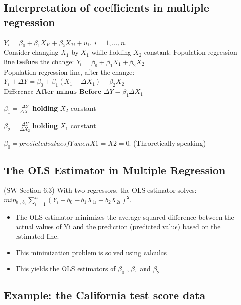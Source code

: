 \documentclass[
  letterpaper,
  DIV=11,
  numbers=noendperiod]{scrartcl}
\begin{document}
\hypertarget{interpretation-of-coefficients-in-multiple-regression}{%
\subsection{Interpretation of coefficients in multiple
regression}\label{interpretation-of-coefficients-in-multiple-regression}}

\(Y_i = \beta_0 + \beta_1 X_{1i} + \beta_2 X_{2i} + u_i, \ i=1,\dots,n.\)\\
Consider changing \(X_1\) by \(X_1\) while holding \(X_2\) constant:
Population regression line \textbf{before} the change:
\(Y_i = \beta_0 + \beta_1 X_1 + \beta_2 X_2\)\\
Population regression line, after the change:
\(Y_i+{\Delta Y} = \beta_0 + \beta_1 (X_1+{\Delta X_1}) + \beta_2 X_2\)\\
Difference \textbf{After minus Before}
\({\Delta Y} = \beta_1 {\Delta X_1}\)

\(\beta_1=\frac{\Delta Y}{\Delta X_1}\) \textbf{holding} \(X_2\)
constant

\(\beta_2=\frac{\Delta Y}{\Delta X_2}\) \textbf{holding} \(X_1\)
constant

\(\beta_0 = predicted value of Y when X1 = X2 = 0\). (Theoretically
speaking)

\hypertarget{the-ols-estimator-in-multiple-regression}{%
\subsection{The OLS Estimator in Multiple
Regression}\label{the-ols-estimator-in-multiple-regression}}

(SW Section 6.3) With two regressors, the OLS estimator solves:
\(min_{b_1,b_2}\sum^n_{i = 1} (Y_i - b_0 - b_1 X_{1i}-b_2 X_{2i})^2.\)

\begin{itemize}
\item
  The OLS estimator minimizes the average squared difference between the
  actual values of Yi and the prediction (predicted value) based on the
  estimated line.
\item
  This minimization problem is solved using calculus
\item
  This yields the OLS estimators of \(\beta_0\) , \(\beta_1\) and
  \(\beta_2\)
\end{itemize}

\hypertarget{example-the-california-test-score-data}{%
\subsection{Example: the California test score
data}\label{example-the-california-test-score-data}}
\end{document}
